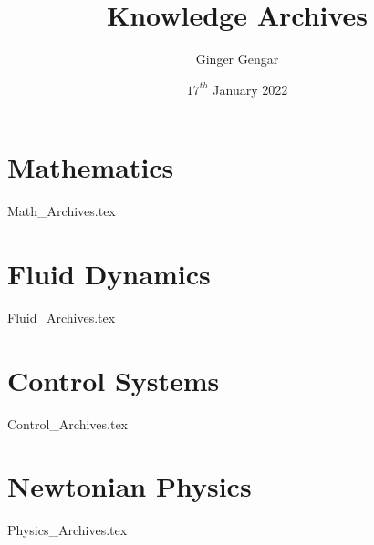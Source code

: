 \documentclass[a4paper, 12pt]{report}
\begin{document}
\title{Knowledge Archives}
\author{Ginger Gengar}
\date{$17^{th}$ January 2022}
\maketitle
\newpage

\tableofcontents

\begin{center}


\part{Mathematics}
{Math_Archives.tex}
\part{Fluid Dynamics}
{Fluid_Archives.tex}
\part{Control Systems}
{Control_Archives.tex}
\part{Newtonian Physics}
{Physics_Archives.tex}


\end{center}
\end{document}
